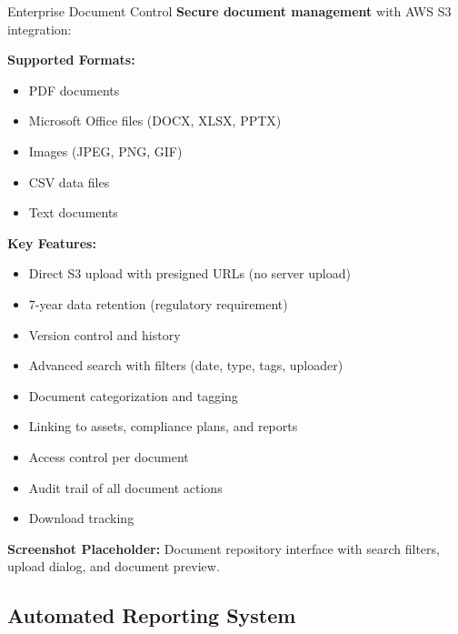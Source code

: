 \documentclass[11pt,a4paper]{article}
\begin{document}
\begin{featurebox}{Enterprise Document Control}
    \textbf{Secure document management} with AWS S3 integration:

    \vspace{0.5cm}
    \textbf{Supported Formats:}
    \begin{itemize}[itemsep=0.2em]
        \item PDF documents
        \item Microsoft Office files (DOCX, XLSX, PPTX)
        \item Images (JPEG, PNG, GIF)
        \item CSV data files
        \item Text documents
    \end{itemize}

    \vspace{0.5cm}
    \textbf{Key Features:}
    \begin{itemize}[itemsep=0.2em]
        \item Direct S3 upload with presigned URLs (no server upload)
        \item 7-year data retention (regulatory requirement)
        \item Version control and history
        \item Advanced search with filters (date, type, tags, uploader)
        \item Document categorization and tagging
        \item Linking to assets, compliance plans, and reports
        \item Access control per document
        \item Audit trail of all document actions
        \item Download tracking
    \end{itemize}
\end{featurebox}

\vspace{0.5cm}

\textbf{Screenshot Placeholder:} Document repository interface with search filters, upload dialog, and document preview.

\vspace{1cm}

\subsection{Automated Reporting System}
\end{document}
